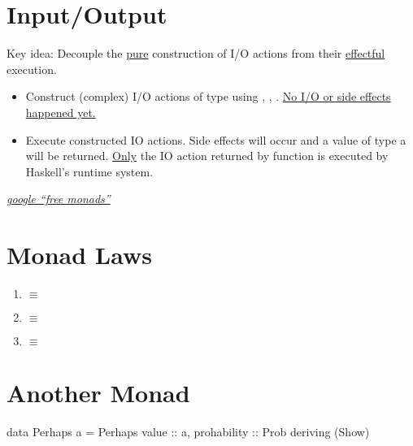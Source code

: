 \section*{Input/Output}
Key idea: Decouple the \underline{pure} construction of I/O actions from their \underline{effectful} execution.
\begin{itemize}
    \item Construct (complex) I/O actions of type  using , , \codeline{>>=}. \underline{No I/O or side effects happened yet.}
    \item Execute constructed IO actions. Side effects will occur and a value of type a will be returned. \underline{Only} the IO action returned by function  is executed by Haskell's runtime system.
\end{itemize}


\vspace{9pt} 

\textit{\href{http://www.google.com/search?q=free+monads}{google ``free monads''}}

\newpage

\section*{Monad Laws}

\begin{enumerate}
    \item {} $\equiv$ 
    \item {} $\equiv$ 
    \item {} $\equiv$ 
\end{enumerate}



\section*{Another Monad}

\begin{codebox}[haskell]
data Perhaps a = Perhaps { value :: a, prohability :: Prob}
deriving (Show)
\end{codebox}

